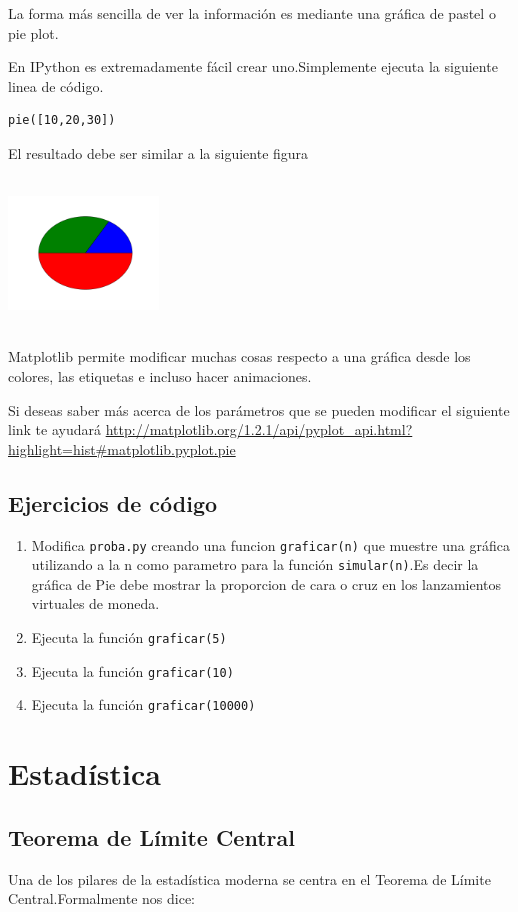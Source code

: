 \documentclass{article}
\begin{document}
La forma más sencilla de ver la información es mediante una gráfica de pastel o pie plot.

En IPython es extremadamente fácil crear uno.Simplemente ejecuta la siguiente linea de código.
\begin{verbatim}
pie([10,20,30])
\end{verbatim}
El resultado debe ser similar a la siguiente figura

\includegraphics[width=4cm, height=4cm]{pastel_1.png}

Matplotlib permite modificar muchas cosas respecto a una gráfica desde los colores, las etiquetas e incluso hacer animaciones.

Si deseas saber más acerca de los parámetros que se pueden modificar el siguiente link te ayudará
\url{http://matplotlib.org/1.2.1/api/pyplot_api.html?highlight=hist#matplotlib.pyplot.pie}

\subsection{Ejercicios de código}
\begin{enumerate}
\item Modifica \verb#proba.py# creando una funcion \verb#graficar(n)# que muestre una gráfica utilizando a la n como parametro para la función \verb#simular(n)#.Es decir la gráfica de Pie debe mostrar la proporcion de cara o cruz en los lanzamientos virtuales de moneda.
\item Ejecuta la función \verb#graficar(5)#
\item Ejecuta la función \verb#graficar(10)#
\item Ejecuta la función \verb#graficar(10000)#
\end{enumerate}
\section{Estadística}
\subsection{Teorema de Límite Central}
Una de los pilares de la estadística moderna se centra en el Teorema de Límite Central.Formalmente nos dice:
\end{document}
